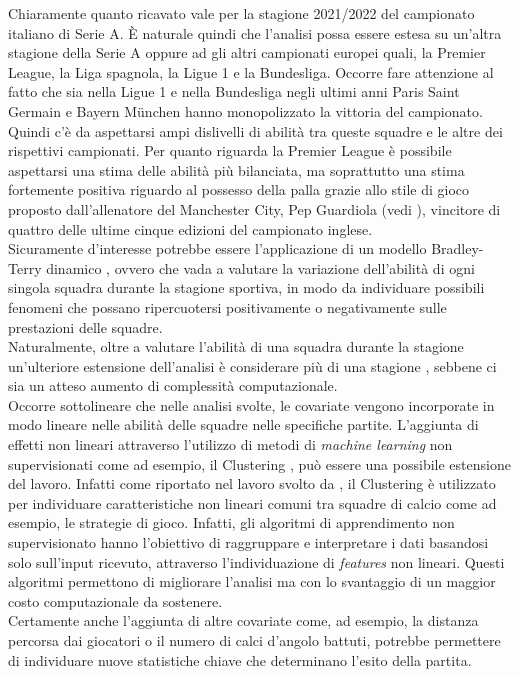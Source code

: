 Chiaramente quanto ricavato vale per la stagione 2021/2022 del campionato italiano di Serie A. È naturale quindi che l'analisi possa essere estesa su un’altra stagione della Serie A oppure ad gli altri campionati europei quali, la Premier League, la Liga spagnola, la Ligue 1 e la Bundesliga. Occorre fare attenzione al fatto che sia nella Ligue 1 e nella Bundesliga negli ultimi anni Paris Saint Germain e Bayern München hanno monopolizzato la vittoria del campionato. Quindi c'è da aspettarsi ampi dislivelli di abilità tra queste squadre e le altre dei rispettivi campionati. Per quanto riguarda la Premier League è possibile aspettarsi una stima delle abilità più bilanciata, ma soprattutto una stima fortemente positiva riguardo al possesso della palla grazie allo stile di gioco proposto dall'allenatore del Manchester City, Pep Guardiola (vedi \textit{\cite{futbol}}), vincitore di quattro delle ultime cinque edizioni del campionato inglese.\\
Sicuramente d'interesse potrebbe essere l'applicazione di un modello Bradley-Terry dinamico \autocite{cattelan2013dynamic}, ovvero che vada a valutare la variazione dell'abilità di ogni singola squadra durante la stagione sportiva, in modo da individuare possibili fenomeni che possano ripercuotersi positivamente o negativamente sulle prestazioni delle squadre.\\
Naturalmente, oltre a valutare l'abilità di una squadra durante la stagione un'ulteriore estensione dell'analisi è considerare più di una stagione \autocite{tsokos2019modeling}, sebbene ci sia un atteso aumento di complessità computazionale. \\
Occorre sottolineare che nelle analisi svolte, le covariate vengono incorporate in modo lineare nelle abilità delle squadre nelle specifiche partite. L'aggiunta di effetti non lineari attraverso l'utilizzo di metodi di \emph{machine learning} non supervisionati come ad esempio, il Clustering \autocite{dunn1974well}, può essere una possibile estensione del lavoro. Infatti come riportato nel lavoro svolto da \textcite{shin2014novel}, il Clustering è utilizzato per individuare caratteristiche non lineari comuni tra squadre di calcio come ad esempio, le strategie di gioco. Infatti, gli algoritmi di apprendimento non supervisionato hanno l'obiettivo di raggruppare e interpretare i dati basandosi solo sull'input ricevuto, attraverso l'individuazione di \emph{features} non lineari. Questi algoritmi permettono di migliorare l'analisi ma con lo svantaggio di un maggior costo computazionale da sostenere.\\
Certamente anche l'aggiunta di altre covariate come, ad esempio, la distanza percorsa dai giocatori o il numero di calci d'angolo battuti, potrebbe permettere di individuare nuove statistiche chiave che determinano l'esito della partita.\\

